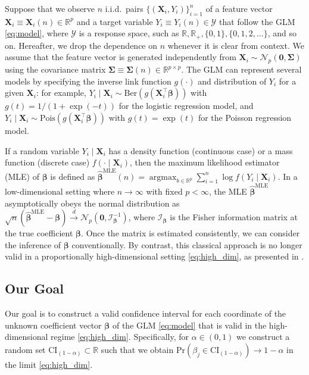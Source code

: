 \documentclass[12pt,reqno]{amsart}
\newcommand{\R}{\mathbb{R}}
\DeclareMathOperator*{\argmax}{arg max}
\newcommand{\cc}{\color{black}}
\renewcommand{\hat}{\widehat}
\def\bzero{\bm{0}}
\def\bX{\bm{X}}
\def\bbeta{\bm{\beta}}
\def\bSigma{\bm{\Sigma}}
\begin{document}
Suppose that we observe {\cc $n$ i.i.d.}\  pairs $\{(\bX_i,Y_i)\}_{i=1}^n$ of a feature vector $\bX_i\equiv\bX_i(n)\in\R^{p}$ and a target variable $Y_i \equiv Y_i(n)\in \mathcal{Y}$ that follow the GLM \eqref{eq:model}, where $\mathcal{Y}$ is a response space, such as $\R,\R_+,\{0,1\},\{0,1,2,\ldots\}$, and so on.  
Hereafter, we drop the dependence on $n$ whenever it is clear from context.
We assume that the feature vector is generated independently from $\bX_i \sim \mathcal{N}_p(\bzero,\bSigma)$ using the covariance matrix $\bSigma\equiv\bSigma(n) \in \R^{p\times p}$.
The GLM can represent several models by specifying the inverse link function $g(\cdot)$ and distribution of $Y_i$ for a given $\bX_i$: for example, $Y_i\mid \bX_i\sim\mathrm{Ber}(g(\bX_i^\top\bbeta))$ with $g(t) = 1/(1 + \exp(-t))$ for the logistic regression model, and $Y_i\mid \bX_i\sim\mathrm{Pois}(g(\bX_i^\top\bbeta))$ with $g(t) = \exp(t)$ for the Poisson regression model.


If a random variable $Y_i\mid \bX_i$ has a density function (continuous case) or a mass function (discrete case) $f(\cdot \mid \bX_i)$, then the maximum likelihood estimator (MLE) of $\bbeta$ is defined as $\hat{\bbeta}^{\mathrm{MLE}}(n)=\argmax_{b\in\R^p}\sum_{i=1}^n \log f(Y_i\mid \bX_i)$.
In a low-dimensional setting where $n\to\infty$ with fixed $p < \infty$, the MLE $\hat{\bbeta}^{\mathrm{MLE}}$ asymptotically obeys the normal distribution as $\sqrt{n}(\hat{\bbeta}^{\mathrm{MLE}}-\bbeta)\overset{d}{\to}\mathcal{N}_p(\bzero,\mathcal{I}_{\bbeta}^{-1})$, where $\mathcal{I}_{\bbeta}$ is the Fisher information matrix at the true coefficient $\bbeta$. Once the matrix is estimated consistently, we can consider the inference of $\bbeta$ conventionally. 
By contrast, this classical approach is no longer valid in a proportionally high-dimensional setting \eqref{eq:high_dim}, as presented in \cite{sur2019modern}. 


\subsection{Our Goal}

Our goal is to construct a valid confidence interval for {\cc each coordinate of} the unknown coefficient vector $\bbeta$ of the GLM \eqref{eq:model} that is valid in the high-dimensional regime \eqref{eq:high_dim}. 
Specifically, for $\alpha \in (0,1)$ we construct a random set $\mathrm{CI}_{(1-\alpha)} \subset \R$ such that we obtain $\mathrm{Pr}(\beta_j \in \mathrm{CI}_{(1-\alpha)}) \to 1 - \alpha$ {\cc in} the limit \eqref{eq:high_dim}.
\end{document}
